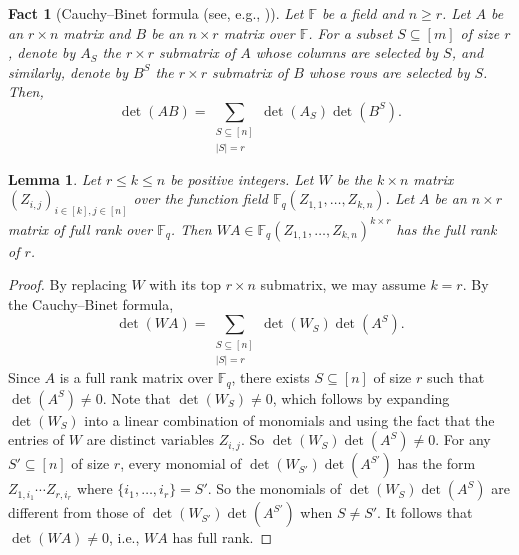 \documentclass[11pt]{article}
\newif\ifmynotes
\newcommand{\ZZnote}[1]{\ifmynotes\textcolor{violet}{[Zihan: #1]}\else\fi}
\theoremstyle{plain}
\newtheorem{lemma}[thm]{Lemma}
\newtheorem{fa}[thm]{Fact}
\theoremstyle{definition}
\theoremstyle{remark}
\newcommand{\F}{\mathbb{F}}
\newcommand{\spa}{\mathrm{span}}
\newcommand{\bv}{\bm{v}}
\begin{document}
\begin{fa}[Cauchy--Binet formula (see, e.g., \cite{tao2023topics})]
Let $\F$ be a field and $n\ge r$. Let $A$ be an $r\times n$ matrix and $B$ be an $n\times r$ matrix over $\F$. For a subset $S\subseteq[m]$ of size $r$, denote by $A_S$ the $r\times r$ submatrix of $A$ whose columns are selected by $S$, and similarly, denote by $B^S$ the $r\times r$ submatrix of $B$ whose rows are selected by $S$. Then,
\[
\det \left(AB\right)=\sum_{\substack{S\subseteq[n]\\|S|=r}}\det(A_S)\det(B^S).
\]
\end{fa}
\begin{lemma}\label{generic_a}
Let $r\leq k\leq n$ be positive integers.
Let $W$ be the $k\times n$ matrix $(Z_{i,j})_{i\in [k], j\in [n]}$ over the function field $\F_q(Z_{1,1},\dots, Z_{k,n})$. 
Let $A$ be an $n\times r$ matrix of full rank over $\F_q$. Then $WA\in \F_q(Z_{1,1},\dots, Z_{k,n})^{k\times r}$ has the full rank of $r$. 
\end{lemma}
\begin{proof}
By replacing $W$ with its top $r\times n$ submatrix, we may assume $k=r$.
By the Cauchy--Binet formula, 
\[\det \left(W A\right)=\sum_{\substack{S\subseteq [n]\\|S|=r}}{\det(W_S)\det(A^S)}.\]
Since $A$ is a full rank matrix over $\F_q$, there exists $S\subseteq [n]$ of size $r$ such that $\det(A^S)\neq 0$. 
Note that $\det(W_S)\neq 0$, which follows by expanding $\det(W_S)$ into a linear combination of monomials and using the fact that the entries of $W$ are distinct variables $Z_{i,j}$.
So $\det(W_S)\det(A^S)\neq 0$.
For any $S'\subseteq [n]$ of size $r$, every monomial of $\det(W_{S'})\det(A^{S'})$ has the form $Z_{1,i_1}\cdots Z_{r, i_r}$ where $\{i_1,\dots,i_r\}=S'$.
So the monomials of $\det(W_S)\det(A^S)$ are different from those of $\det(W_{S'})\det(A^{S'})$ when $S\neq S'$.
It follows that $\det(WA)\neq 0$, i.e., $W A$ has full rank. 
\end{proof}
\end{document}
